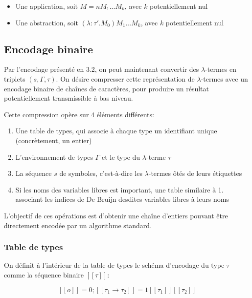 \documentclass[titlepage]{article}
\providecommand{\tightlist}{%
  \setlength{\itemsep}{0pt}\setlength{\parskip}{0pt}}
\begin{document}
\begin{itemize}
\tightlist
\item
  Une application, soit \(M = nM_1...M_k\), avec \(k\) potentiellement
  nul
\item
  Une abstraction, soit \((\lambda:\tau'.M_0)M_1...M_k\), avec \(k\)
  potentiellement nul
\end{itemize}

\subsection{Encodage binaire}\label{encodage-binaire}

Par l'encodage présenté en 3.2, on peut maintenant convertir des
\(\lambda\)-termes en triplets \((s, \Gamma, \tau)\). On désire
compresser cette représentation de \(\lambda\)-termes avec un encodage
binaire de chaînes de caractères, pour produire un résultat
potentiellement transmissible à bas niveau.

Cette compression opère sur 4 éléments différents:

\begin{enumerate}
\def\labelenumi{\arabic{enumi}.}
\tightlist
\item
  Une table de types, qui associe à chaque type un identifiant unique
  (concrètement, un entier)
\item
  L'environnement de types \(\Gamma\) et le type du \(\lambda\)-terme
  \(\tau\)
\item
  La séquence \(s\) de symboles, c'est-à-dire les \(\lambda\)-termes
  ôtés de leurs étiquettes
\item
  Si les noms des variables libres est important, une table similaire à
  1. associant les indices de De Bruijn desdites variables libres à
  leurs noms
\end{enumerate}

L'objectif de ces opérations est d'obtenir une chaîne d'entiers pouvant
être directement encodée par un algorithme standard.

\subsubsection{Table de types}\label{table-de-types}

On définit à l'intérieur de la table de types le schéma d'encodage du
type \(\tau\) comme la séquence binaire \([\![\tau]\!]\):

\[[\![o]\!] = 0; [\![\tau_1 \rightarrow \tau_2]\!] = 1[\![\tau_1]\!][\![\tau_2]\!]\]
\end{document}
